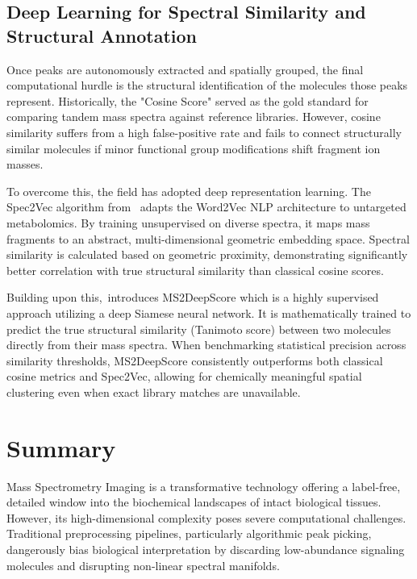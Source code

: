 \documentclass[
12pt, %
oneside, %
english, %
onehalfspacing, %
nolistspacing, %
headsepline, %
]{MastersDoctoralThesis} %
\begin{document}
\subsection*{Deep Learning for Spectral Similarity and Structural Annotation}

Once peaks are autonomously extracted and spatially grouped, the final computational hurdle is the structural identification of the molecules those peaks represent. Historically, the "Cosine Score" served as the gold standard for comparing tandem mass spectra against reference libraries. However, cosine similarity suffers from a high false-positive rate and fails to connect structurally similar molecules if minor functional group modifications shift fragment ion masses.

To overcome this, the field has adopted deep representation learning. The Spec2Vec algorithm from~\citet{huber2021spec2vec} adapts the Word2Vec NLP architecture to untargeted metabolomics. By training unsupervised on diverse spectra, it maps mass fragments to an abstract, multi-dimensional geometric embedding space. Spectral similarity is calculated based on geometric proximity, demonstrating significantly better correlation with true structural similarity than classical cosine scores.

Building upon this,~\citet{huber2021ms2deepscore}introduces MS2DeepScore which is a highly supervised approach utilizing a deep Siamese neural network. It is mathematically trained to predict the true structural similarity (Tanimoto score) between two molecules directly from their mass spectra. When benchmarking statistical precision across similarity thresholds, MS2DeepScore consistently outperforms both classical cosine metrics and Spec2Vec, allowing for chemically meaningful spatial clustering even when exact library matches are unavailable.

\section{Summary}

Mass Spectrometry Imaging is a transformative technology offering a label-free, detailed window into the biochemical landscapes of intact biological tissues. However, its high-dimensional complexity poses severe computational challenges. Traditional preprocessing pipelines, particularly algorithmic peak picking, dangerously bias biological interpretation by discarding low-abundance signaling molecules and disrupting non-linear spectral manifolds.
\end{document}
